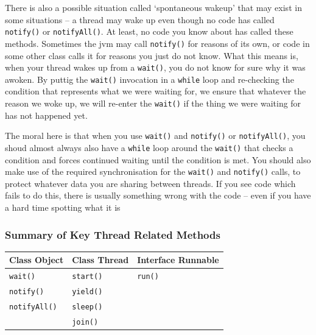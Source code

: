 There is also a possible situation called `spontaneous wakeup' that may exist 
in some situations -- a thread may wake up even though no code has called 
\verb#notify()# or \verb#notifyAll()#. At least, no code you know about has 
called these methods. Sometimes the jvm may call \verb#notify()# for reasons of 
its own, or code in some other class calls it for reasons you just do not know.
What this means is, when your thread wakes up from a \verb#wait()#, you do not 
know for sure why it was awoken. By puttig the \verb#wait()# invocation in a 
\verb#while# loop and re-checking the condition that represents what we were 
waiting for, we ensure that whatever the reason we woke up, we will re-enter 
the \verb#wait()# if the thing we were waiting for has not happened yet. 

The moral here is that when you use \verb#wait()# and \verb#notify()# or 
\verb#notifyAll()#, you shoud almost always also have a \verb#while# loop 
around the \verb#wait()# that checks a condition and forces continued waiting 
until the condition is met. You should also make use of the required 
synchronisation for the \verb#wait()# and \verb#notify()# calls, to protect 
whatever data you are sharing between threads. If you see code which fails to 
do this, there is usually something wrong with the code -- even if you have a 
hard time spotting what it is

\subsubsection{Summary of Key Thread Related Methods}
\begin{center}
\begin{tabular}{lll}
    \textbf{Class Object} & \textbf{Class Thread} & \textbf{Interface Runnable} 
    \\
    \hline
    \verb#wait()# & \verb#start()# & \verb#run()# \\
    \verb#notify()# & \verb#yield()# & \\
    \verb#notifyAll()# & \verb#sleep()# & \\
    & \verb#join()# & \\
\end{tabular}
\end{center}
